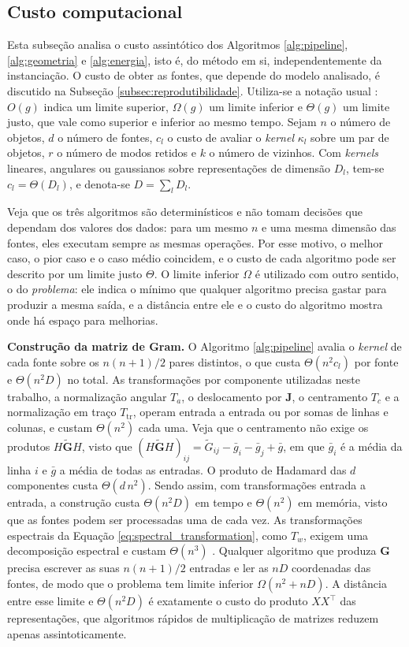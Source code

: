 \subsection{Custo computacional}\label{subsec:custo}

Esta subseção analisa o custo assintótico dos Algoritmos \ref{alg:pipeline}, \ref{alg:geometria} e \ref{alg:energia}, isto é, do método em si, independentemente da instanciação. O custo de obter as fontes, que depende do modelo analisado, é discutido na Subseção \ref{subsec:reprodutibilidade}. Utiliza-se a notação usual \citep{Cormen2009}: $O(g)$ indica um limite superior, $\Omega(g)$ um limite inferior e $\Theta(g)$ um limite justo, que vale como superior e inferior ao mesmo tempo. Sejam $n$ o número de objetos, $d$ o número de fontes, $c_l$ o custo de avaliar o \textit{kernel} $\kappa_l$ sobre um par de objetos, $r$ o número de modos retidos e $k$ o número de vizinhos. Com \textit{kernels} lineares, angulares ou gaussianos sobre representações de dimensão $D_l$, tem-se $c_l = \Theta(D_l)$, e denota-se $D = \sum_l D_l$.

Veja que os três algoritmos são determinísticos e não tomam decisões que dependam dos valores dos dados: para um mesmo $n$ e uma mesma dimensão das fontes, eles executam sempre as mesmas operações. Por esse motivo, o melhor caso, o pior caso e o caso médio coincidem, e o custo de cada algoritmo pode ser descrito por um limite justo $\Theta$. O limite inferior $\Omega$ é utilizado com outro sentido, o do \textit{problema}: ele indica o mínimo que qualquer algoritmo precisa gastar para produzir a mesma saída, e a distância entre ele e o custo do algoritmo mostra onde há espaço para melhorias.

\textbf{Construção da matriz de Gram.} O Algoritmo \ref{alg:pipeline} avalia o \textit{kernel} de cada fonte sobre os $n(n+1)/2$ pares distintos, o que custa $\Theta(n^2 c_l)$ por fonte e $\Theta(n^2 D)$ no total. As transformações por componente utilizadas neste trabalho, a normalização angular $T_a$, o deslocamento por $\mathbf{J}$, o centramento $T_c$ e a normalização em traço $T_{\mathrm{tr}}$, operam entrada a entrada ou por somas de linhas e colunas, e custam $\Theta(n^2)$ cada uma. Veja que o centramento não exige os produtos $H\widetilde{\mathbf{G}}H$, visto que $(H\widetilde{\mathbf{G}}H)_{ij} = \widetilde{G}_{ij} - \bar{g}_i - \bar{g}_j + \bar{g}$, em que $\bar{g}_i$ é a média da linha $i$ e $\bar{g}$ a média de todas as entradas. O produto de Hadamard das $d$ componentes custa $\Theta(d\,n^2)$. Sendo assim, com transformações entrada a entrada, a construção custa $\Theta(n^2 D)$ em tempo e $\Theta(n^2)$ em memória, visto que as fontes podem ser processadas uma de cada vez. As transformações espectrais da Equação \eqref{eq:spectral_transformation}, como $T_w$, exigem uma decomposição espectral e custam $\Theta(n^3)$ \citep{GolubVanLoan2013}. Qualquer algoritmo que produza $\mathbf{G}$ precisa escrever as suas $n(n+1)/2$ entradas e ler as $nD$ coordenadas das fontes, de modo que o problema tem limite inferior $\Omega(n^2 + nD)$. A distância entre esse limite e $\Theta(n^2 D)$ é exatamente o custo do produto $XX^\top$ das representações, que algoritmos rápidos de multiplicação de matrizes reduzem apenas assintoticamente.

